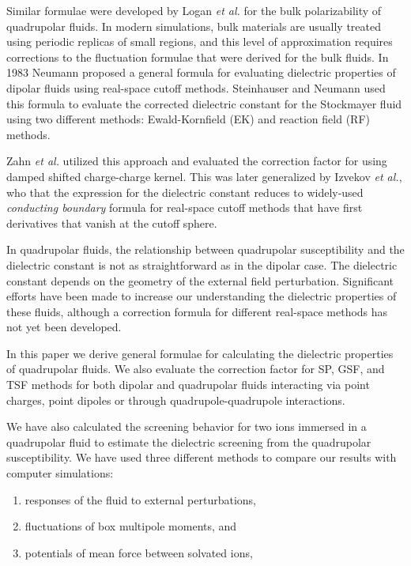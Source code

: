 Similar formulae were developed by Logan \textit{et al.} for the bulk
polarizability of quadrupolar fluids.\cite{LoganI81,LoganII82,LoganIII82}
In modern simulations, bulk materials are usually treated using
periodic replicas of small regions, and this level of approximation
requires corrections to the fluctuation formulae that were derived for
the bulk fluids. In 1983 Neumann proposed a general formula for
evaluating dielectric properties of dipolar fluids using real-space
cutoff methods.\cite{NeumannI83} Steinhauser and Neumann used this
formula to evaluate the corrected dielectric constant for the
Stockmayer fluid using two different methods: Ewald-Kornfield (EK) and
reaction field (RF) methods.\cite{NeumannII83}

Zahn \textit{et al.}\cite{Zahn02} utilized this approach and evaluated
the correction factor for using damped shifted charge-charge
kernel. This was later generalized by Izvekov \textit{et
  al.},\cite{Izvekov08} who that the expression for the
dielectric constant reduces to widely-used \textit{conducting
  boundary} formula for real-space cutoff methods that have first
derivatives that vanish at the cutoff sphere.

In quadrupolar fluids, the relationship between quadrupolar
susceptibility and the dielectric constant is not as straightforward
as in the dipolar case. The dielectric constant depends on the
geometry of the external field perturbation.\cite{Ernst92} Significant
efforts have been made to increase our understanding the dielectric
properties of these fluids,\cite{JeonI03,JeonII03,Chitanvis96}
although a correction formula for different real-space methods has not
yet been developed.

In this paper we derive general formulae for calculating the
dielectric properties of quadrupolar fluids. We also evaluate the
correction factor for SP, GSF, and TSF methods for both dipolar and
quadrupolar fluids interacting via point charges, point dipoles or
through quadrupole-quadrupole interactions.

We have also calculated the screening behavior for two ions immersed
in a quadrupolar fluid to estimate the dielectric screening from the
quadrupolar susceptibility.  We have used three different methods to
compare our results with computer simulations:
\begin{enumerate}
\item responses of the fluid to external perturbations,
\item fluctuations of box multipole moments, and
\item potentials of mean force between solvated ions,
\end{enumerate}

